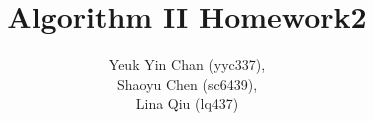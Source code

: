 \documentclass[12pt]{article}
\begin{document}
 
 
\title{Algorithm II Homework2}
\author{Yeuk Yin Chan (yyc337),\\
Shaoyu Chen (sc6439),\\
Lina Qiu (lq437)}

\maketitle







 
\end{document}
